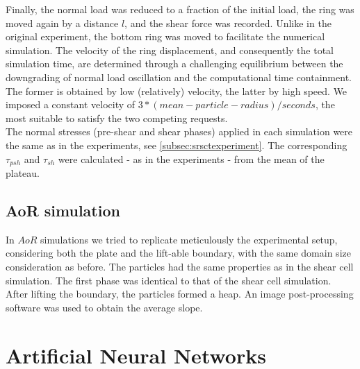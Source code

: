 \documentclass[review]{elsarticle}
\begin{document}
\begin{appendix}
Finally, the normal load was reduced to a fraction of the initial load, 
the ring was moved again by a distance $l$, and the shear force was recorded. 
Unlike in the original experiment, the bottom ring was moved to facilitate the numerical simulation. 
The velocity of the ring displacement, and consequently the total simulation time, are determined 
through a challenging equilibrium between the downgrading of normal load oscillation and the computational time containment. 
The former is obtained by low (relatively) velocity, the latter by high speed. We imposed a constant velocity 
of $3*(mean-particle-radius)/seconds$, the most suitable to satisfy the two competing requests. \\
The normal stresses (pre-shear and shear phases) applied in each simulation were
the same as in the experiments, see \ref{subsec:srsctexperiment}.
The corresponding $\tau_{psh}$ and $\tau_{sh}$ were calculated - as in the experiments - from the mean of the plateau.\\

\subsection{AoR simulation}
\label{subsec:aorsimulation}
In $AoR$ simulations we tried to replicate meticulously the experimental setup, 
considering both the plate and the lift-able boundary, with the same domain size consideration as before. 
The particles had the same properties as in the shear cell simulation. The first phase was identical to that of the shear cell simulation. 
After lifting the boundary, the particles formed a heap.
An image post-processing software was used to obtain the average slope.


\section{Artificial Neural Networks}
\label{sec:appann}


\end{appendix}
\end{document}
